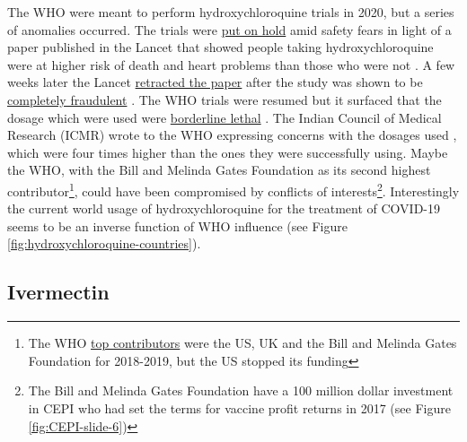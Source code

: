 \documentclass[11pt,a4paper,notitlepage]{report}
\begin{document}
The WHO were meant to perform hydroxychloroquine trials in 2020, but a series of anomalies occurred. The trials were \href{https://www.theguardian.com/world/2020/may/25/who-world-health-organization-hydroxychloroquine-trial-trump-coronavirus-safety-fears}{put on hold} amid safety fears in light of a paper published in the Lancet that showed people taking hydroxychloroquine were at higher risk of death and heart problems than those who were not \cite{guardian25052020} . A few weeks later the Lancet \href{https://www.theguardian.com/world/2020/jun/04/covid-19-lancet-retracts-paper-that-halted-hydroxychloroquine-trials}{retracted the paper} \cite{guardian03062020} after the study was shown to be \href{https://www.theguardian.com/world/2020/jun/03/covid-19-surgisphere-who-world-health-organization-hydroxychloroquine}{completely fraudulent} \cite{guardian03062020b}. The WHO trials were resumed but it surfaced that the dosage which were used were \href{https://www.francesoir.fr/politique-monde/oxford-recovery-et-solidarity-overdosage-two-clinical-trials-acts-considered}{borderline lethal} \cite{francesoir25062020}. The Indian Council of Medical Research (ICMR) wrote to the WHO expressing concerns with the dosages used \cite{newindianexpress29052020}, which were four times higher than the ones they were successfully using. Maybe the WHO, with the Bill and Melinda Gates Foundation as its second highest contributor\footnote{The WHO \href{https://www.who.int/about/funding/contributors}{top contributors} \cite{who-contributors2020} were the US, UK and the Bill and Melinda Gates Foundation for 2018-2019, but the US stopped its funding}, could have been compromised by conflicts of interests\footnote{The Bill and Melinda Gates Foundation have a 100 million dollar investment in CEPI who had set the terms for vaccine profit returns in 2017 (see Figure \ref{fig:CEPI-slide-6})}. Interestingly the current world usage of hydroxychloroquine for the treatment of COVID-19 seems to be an inverse function of WHO influence (see Figure \ref{fig:hydroxychloroquine-countries}).


\subsection*{Ivermectin}
\end{document}
